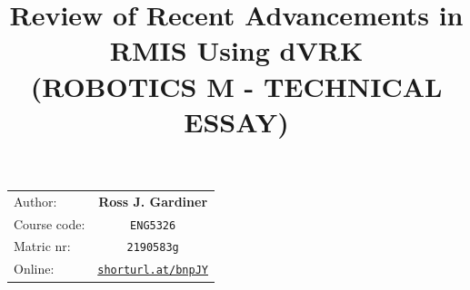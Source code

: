 \documentclass[english]{sobraep}
\title{Review of Recent Advancements in RMIS Using dVRK\\(ROBOTICS M - TECHNICAL ESSAY)}
\newcommand\rurl[1]{%
  \href{http://#1}{\nolinkurl{#1}}%
}
\begin{document}
\maketitle
\begin{tabular}{l|c}
 Author: & \textbf{Ross J. Gardiner}   \\
 Course code: & \verb|ENG5326| \\
 Matric nr: & \verb|2190583g| \\
Online: & \rurl{shorturl.at/bnpJY}   \\
\end{tabular}
    
        
            
    
        
        
        
        
        
    
        
            
\end{document}
